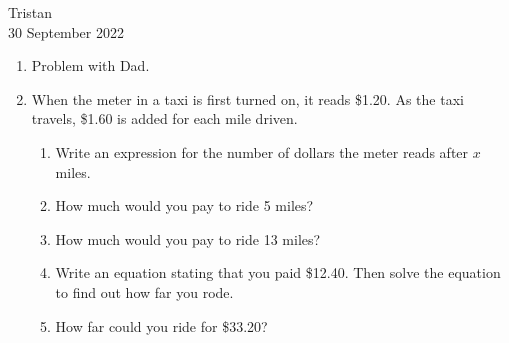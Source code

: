 \documentclass[14pt]{extarticle} %
\begin{document}
\hfill Tristan\\
\null\hfill 30 September 2022

\vspace{10mm}

\begin{enumerate}[label=\Alph*.), itemsep=\fill]
    \item Problem with Dad.
    \item  When the meter in a taxi is first turned on, it reads \$1.20. As the taxi travels, \$1.60 is added for each mile driven. 
    \begin{enumerate}[itemsep=\fill]
        \item Write an expression for the number of dollars the meter reads after $x$ miles.
        \item How much would you pay to ride 5 miles?
        \item How much would you pay to ride 13 miles?
        \item Write an equation stating that you paid \$12.40. Then solve the equation to find out how far you rode.
        \item How far could you ride for \$33.20?
    \end{enumerate}
\vfill\end{enumerate}
\end{document}
